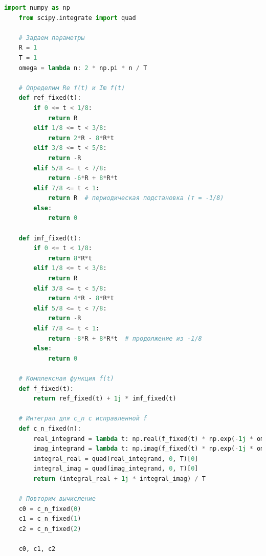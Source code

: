 \begin{lstlisting}[language=Python, caption=Вычисление коэффициентов Фурье для комплекснозначной функции]
    import numpy as np
    from scipy.integrate import quad
    
    # Задаем параметры
    R = 1
    T = 1
    omega = lambda n: 2 * np.pi * n / T
    
    # Определим Re f(t) и Im f(t)
    def ref_fixed(t):
        if 0 <= t < 1/8:
            return R
        elif 1/8 <= t < 3/8:
            return 2*R - 8*R*t
        elif 3/8 <= t < 5/8:
            return -R
        elif 5/8 <= t < 7/8:
            return -6*R + 8*R*t
        elif 7/8 <= t < 1:
            return R  # периодическая подстановка (т = -1/8)
        else:
            return 0
    
    def imf_fixed(t):
        if 0 <= t < 1/8:
            return 8*R*t
        elif 1/8 <= t < 3/8:
            return R
        elif 3/8 <= t < 5/8:
            return 4*R - 8*R*t
        elif 5/8 <= t < 7/8:
            return -R
        elif 7/8 <= t < 1:
            return -8*R + 8*R*t  # продолжение из -1/8
        else:
            return 0
    
    # Комплексная функция f(t)
    def f_fixed(t):
        return ref_fixed(t) + 1j * imf_fixed(t)
    
    # Интеграл для c_n с исправленной f
    def c_n_fixed(n):
        real_integrand = lambda t: np.real(f_fixed(t) * np.exp(-1j * omega(n) * t))
        imag_integrand = lambda t: np.imag(f_fixed(t) * np.exp(-1j * omega(n) * t))
        integral_real = quad(real_integrand, 0, T)[0]
        integral_imag = quad(imag_integrand, 0, T)[0]
        return (integral_real + 1j * integral_imag) / T
    
    # Повторим вычисление
    c0 = c_n_fixed(0)
    c1 = c_n_fixed(1)
    c2 = c_n_fixed(2)
    
    c0, c1, c2
\end{lstlisting}

